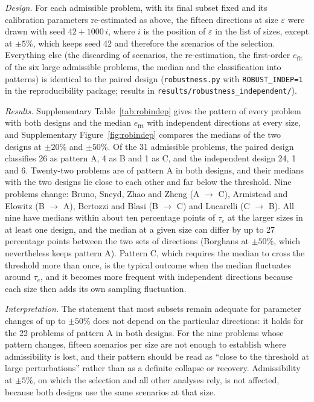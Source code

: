 \emph{Design.} For each admissible problem, with its final subset fixed and its calibration parameters re-estimated as above, the fifteen directions at size $\varepsilon$ were drawn with seed $42+1000\,i$, where $i$ is the position of $\varepsilon$ in the list of sizes, except at $\pm5\%$, which keeps seed 42 and therefore the scenarios of the selection. Everything else (the discarding of scenarios, the re-estimation, the first-order $e_{\mathrm{fit}}$ of the six large admissible problems, the median and the classification into patterns) is identical to the paired design (\texttt{robustness.py} with \texttt{ROBUST\_INDEP=1} in the reproducibility package; results in \texttt{results/robustness\_independent/}).

\emph{Results.} Supplementary Table~\ref{tab:robindep} gives the pattern of every problem with both designs and the median $e_{\mathrm{fit}}$ with independent directions at every size, and Supplementary Figure~\ref{fig:robindep} compares the medians of the two designs at $\pm20\%$ and $\pm50\%$. Of the 31 admissible problems, the paired design classifies 26 as pattern A, 4 as B and 1 as C, and the independent design 24, 1 and 6. Twenty-two problems are of pattern A in both designs, and their medians with the two designs lie close to each other and far below the threshold. Nine problems change: Bruno, Sneyd, Zhao and Zheng (A $\to$ C), Armistead and Elowitz (B $\to$ A), Bertozzi and Blasi (B $\to$ C) and Lucarelli (C $\to$ B). All nine have medians within about ten percentage points of $\tau_e$ at the larger sizes in at least one design, and the median at a given size can differ by up to 27 percentage points between the two sets of directions (Borghans at $\pm50\%$, which nevertheless keeps pattern A). Pattern C, which requires the median to cross the threshold more than once, is the typical outcome when the median fluctuates around $\tau_e$, and it becomes more frequent with independent directions because each size then adds its own sampling fluctuation.

\emph{Interpretation.} The statement that most subsets remain adequate for parameter changes of up to $\pm50\%$ does not depend on the particular directions: it holds for the 22 problems of pattern A in both designs. For the nine problems whose pattern changes, fifteen scenarios per size are not enough to establish where admissibility is lost, and their pattern should be read as ``close to the threshold at large perturbations'' rather than as a definite collapse or recovery. Admissibility at $\pm5\%$, on which the selection and all other analyses rely, is not affected, because both designs use the same scenarios at that size.

